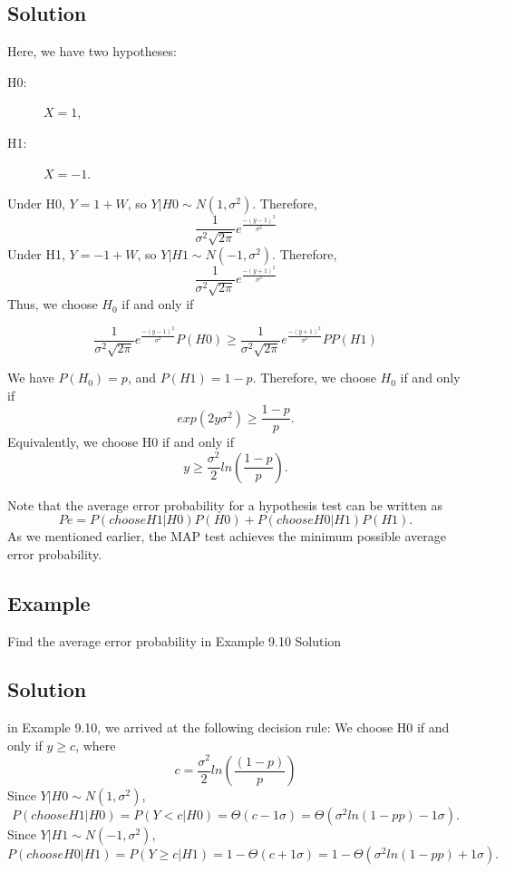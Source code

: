 \documentclass[]{report}
\begin{document}
\subsection{Solution}


Here, we have two hypotheses: 
\begin{description}
\item[H0:] $X=1$,
\item[H1:] $X=−1$.
\end{description}


Under H0, $Y=1+W$, so $Y|H0\sim N(1,\sigma^2)$. Therefore,
\[
\frac{1}{\sigma^2 \sqrt{2\pi} }e^{\frac{−(y−1)^2}{\sigma^2}} 
\]
Under H1, $Y=−1+W$, so $Y|H1\sim N(−1,\sigma^2)$. Therefore,
\[
\frac{1}{\sigma^2 \sqrt{2\pi} }e^{\frac{−(y+1)^2}{\sigma^2}}
\]
Thus, we choose $H_0$ if and only if

\[ \frac{1}{\sigma^2 \sqrt{2\pi} }e^{\frac{−(y−1)^2}{\sigma^2}} P(H0) \geq \frac{1}{\sigma^2 \sqrt{2\pi} }e^{\frac{−(y+1)^2}{\sigma^2}} PP(H1)\]

We have $P(H_0)=p$, and $P(H1)=1−p$. Therefore, we choose $H_0$ if and only if
\[exp(2y\sigma^2)\geq \frac{1−p}{p}.\]
Equivalently, we choose H0 if and only if
\[y\geq \frac{\sigma^2}{2}ln \left(\frac{1−p}{p}\right).\]

Note that the average error probability for a hypothesis test can be written as
\[Pe=P(choose H1|H0)P(H0)+P(choose H0|H1)P(H1).\]
As we mentioned earlier, the MAP test achieves the minimum possible average error probability.

\subsection*{Example}
Find the average error probability in Example 9.10
Solution


\subsection*{Solution}
in Example 9.10, we arrived at the following decision rule: We choose H0 if and only if $y\geq c$,
where
\[c= \frac{\sigma^2}{2} ln \left(\frac{(1−p)}{p} \right)\]
Since $Y|H0\sim N(1,\sigma^2)$,
\[P(choose H1|H0)=P(Y<c|H0)=\Theta(c−1σ)=\Theta(\sigma^2ln(1−pp)−1σ).\]
Since $Y|H1\sim N(−1,\sigma^2)$,
\[P(choose H0|H1)=P(Y\geq c|H1)=1−\Theta(c+1σ)=1−\Theta(\sigma^2ln(1−pp)+1σ).
\]
\end{document}
